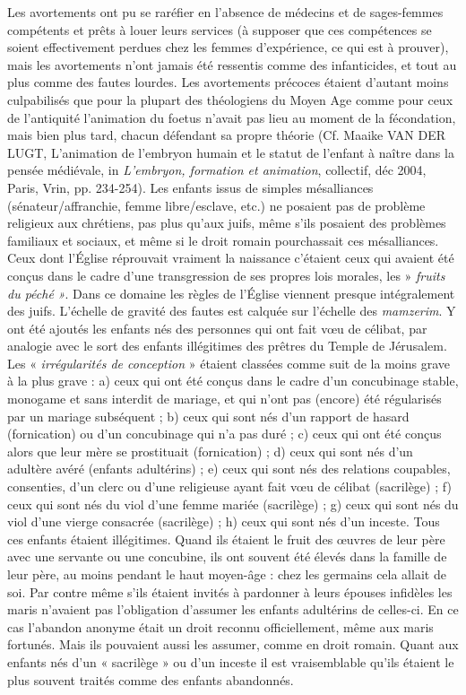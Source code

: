  Les avortements ont pu se raréfier en l'absence de médecins et de sages-femmes compétents et prêts à louer leurs services (à supposer que ces compétences se soient effectivement perdues chez les femmes d'expérience, ce qui est à prouver), mais les avortements n'ont jamais été ressentis comme des infanticides, et tout au plus comme des fautes lourdes. Les avortements précoces étaient d'autant moins culpabilisés que pour la plupart des théologiens du Moyen Age comme pour ceux de l'antiquité l'animation du foetus n'avait pas lieu au moment de la fécondation, mais bien plus tard, chacun défendant sa propre théorie (Cf. Maaike VAN DER LUGT, L'animation de l'embryon humain et le statut de l'enfant à naître dans la pensée médiévale, in \emph{L'embryon, formation et animation}, collectif, déc 2004, Paris, Vrin, pp. 234-254). 
 Les enfants issus de simples mésalliances (sénateur/affranchie, femme libre/esclave, etc.) ne posaient pas de problème religieux aux chrétiens, pas plus qu'aux juifs, même s'ils posaient des problèmes familiaux et sociaux, et même si le droit romain pourchassait ces mésalliances. Ceux dont l'Église réprouvait vraiment la naissance c'étaient ceux qui avaient été conçus dans le cadre d'une transgression de ses propres lois morales, les » \emph{fruits du péché} \emph{ »}. 
 Dans ce domaine les règles de l'Église viennent presque intégralement des juifs. L'échelle de gravité des fautes est calquée sur l'échelle des \emph{mamzerim}. Y ont été ajoutés les enfants nés des personnes qui ont fait vœu de célibat, par analogie avec le sort des enfants illégitimes des prêtres du Temple de Jérusalem. 
 Les « \emph{irrégularités de conception} » étaient classées comme suit de la moins grave à la plus grave : a) ceux qui ont été conçus dans le cadre d'un concubinage stable, monogame et sans interdit de mariage, et qui n'ont pas (encore) été régularisés par un mariage subséquent ; b) ceux qui sont nés d'un rapport de hasard (fornication) ou d'un concubinage qui n'a pas duré ; c) ceux qui ont été conçus alors que leur mère se prostituait (fornication) ; d) ceux qui sont nés d'un adultère avéré (enfants adultérins) ; e) ceux qui sont nés des relations coupables, consenties, d'un clerc ou d'une religieuse ayant fait vœu de célibat (sacrilège) ; f) ceux qui sont nés du viol d'une femme mariée (sacrilège) ; g) ceux qui sont nés du viol d'une vierge consacrée (sacrilège) ; h) ceux qui sont nés d'un inceste. 
 Tous ces enfants étaient illégitimes. Quand ils étaient le fruit des œuvres de leur père avec une servante ou une concubine, ils ont souvent été élevés dans la famille de leur père, au moins pendant le haut moyen-âge : chez les germains cela allait de soi. Par contre même s'ils étaient invités à pardonner à leurs épouses infidèles les maris n'avaient pas l'obligation d'assumer les enfants adultérins de celles-ci. En ce cas l'abandon anonyme était un droit reconnu officiellement, même aux maris fortunés. Mais ils pouvaient aussi les assumer, comme en droit romain. Quant aux enfants nés d'un « sacrilège » ou d'un inceste il est vraisemblable qu'ils étaient le plus souvent traités comme des enfants abandonnés.

